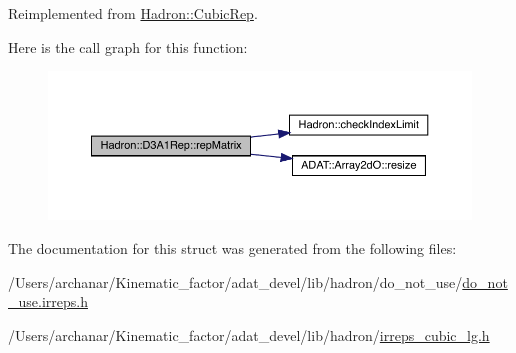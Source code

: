 Reimplemented from \mbox{\hyperlink{structHadron_1_1CubicRep_ac5d7e9e6f4ab1158b5fce3e4ad9e8005}{Hadron\+::\+Cubic\+Rep}}.

Here is the call graph for this function\+:
\nopagebreak
\begin{figure}[H]
\begin{center}
\leavevmode
\includegraphics[width=350pt]{d4/df6/structHadron_1_1D3A1Rep_a618d921105d92d30f7b3c838af644a74_cgraph}
\end{center}
\end{figure}


The documentation for this struct was generated from the following files\+:\begin{DoxyCompactItemize}
\item 
/\+Users/archanar/\+Kinematic\+\_\+factor/adat\+\_\+devel/lib/hadron/do\+\_\+not\+\_\+use/\mbox{\hyperlink{do__not__use_8irreps_8h}{do\+\_\+not\+\_\+use.\+irreps.\+h}}\item 
/\+Users/archanar/\+Kinematic\+\_\+factor/adat\+\_\+devel/lib/hadron/\mbox{\hyperlink{lib_2hadron_2irreps__cubic__lg_8h}{irreps\+\_\+cubic\+\_\+lg.\+h}}\end{DoxyCompactItemize}
